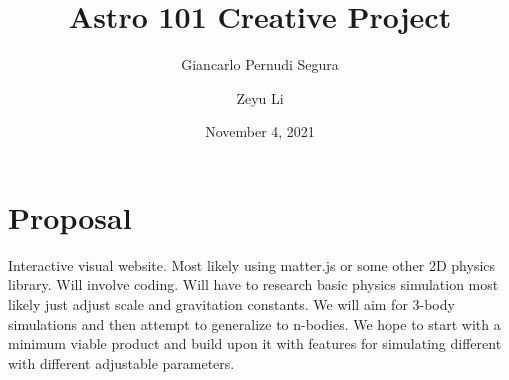 \documentclass{article}
\title{Astro 101 Creative Project}
\author[1]{Giancarlo Pernudi Segura}
\affil{pernudi@ualberta.ca}
\author[2]{Zeyu Li}
\affil{zeyu7@ualberta.ca}
\date{November 4, 2021}
\begin{document}
\maketitle

\section{Proposal}

Interactive visual website. Most likely using matter.js or some other 2D physics library. Will involve coding. Will have to research basic physics simulation most likely just adjust scale and gravitation constants. We will aim for 3-body simulations and then attempt to generalize to n-bodies. We hope to start with a minimum viable product and build upon it with features for simulating different with different adjustable parameters.
\end{document}
